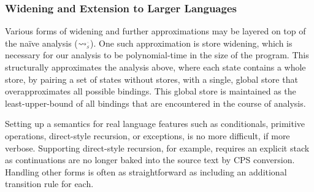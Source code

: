 \subsubsection{Widening and Extension to Larger Languages}
\label{sec:aam:extension}
%
Various forms of widening and further approximations may be layered on top of the na\"ive analysis ($\pdToS$).
%
One such approximation is store widening, which is necessary for our analysis to be polynomial-time in the size of the program.
%
This structurally approximates the analysis above, where each state contains a whole store, by pairing a set of states without stores, with a single, global store that overapproximates all possible bindings.
%
This global store is maintained as the least-upper-bound of all bindings that are encountered in the course of analysis.



Setting up a semantics for real language features such as conditionals, primitive operations, direct-style recursion, 
or exceptions, is no more difficult, if more verbose.
%
Supporting direct-style recursion, for example, requires an explicit stack as continuations are no longer baked into the 
source text by CPS conversion.
%
Handling other forms is often as straightforward as including an additional transition rule for each.
%

